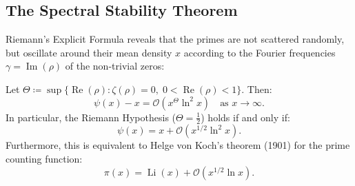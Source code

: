 \subsection{The Spectral Stability Theorem}

Riemann's Explicit Formula reveals that the primes are not scattered randomly, but oscillate around their mean density $x$ according to the Fourier frequencies $\gamma = \operatorname{Im}(\rho)$ of the non-trivial zeros:

\begin{theorem}
\label{thm:spectral_stability}
\leanok
Let $\Theta \coloneqq \sup \{ \operatorname{Re}(\rho) : \zeta(\rho) = 0, \; 0 < \operatorname{Re}(\rho) < 1 \}$.
Then:
\begin{equation}
\label{eq:psi_error_bound}
\psi(x) - x = \mathcal{O}\left( x^\Theta \ln^2 x \right) \quad \text{as } x \to \infty.
\end{equation}
In particular, the Riemann Hypothesis ($\Theta = \frac{1}{2}$) holds if and only if:
\begin{equation}
\label{eq:psi_rh_bound}
\psi(x) = x + \mathcal{O}\left( x^{1/2} \ln^2 x \right).
\end{equation}
Furthermore, this is equivalent to Helge von Koch's theorem (1901) for the prime counting function:
\begin{equation}
\label{eq:pi_von_koch}
\pi(x) = \operatorname{Li}(x) + \mathcal{O}\left( x^{1/2} \ln x \right).
\end{equation}
\end{theorem}

